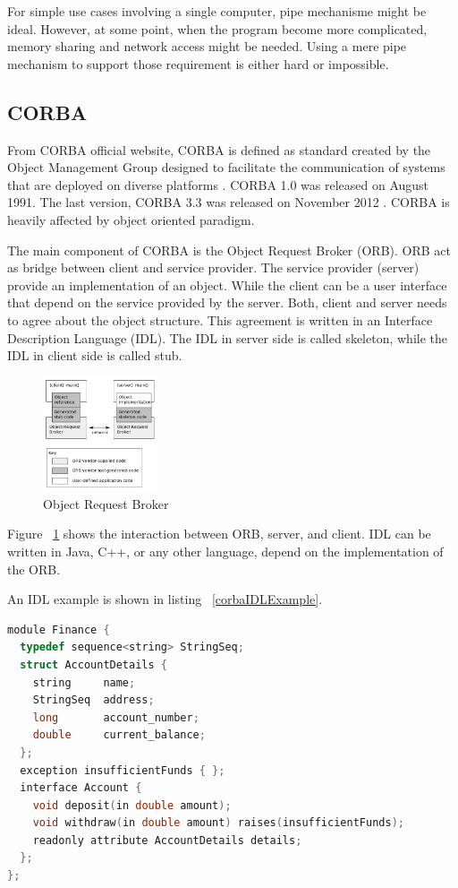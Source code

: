 \documentclass[conference]{IEEEtran}
\begin{document}
For simple use cases involving a single computer, pipe mechanisme might be ideal. 
However, at some point, when the program become more complicated, memory sharing 
and network access might be needed. Using a mere pipe mechanism to support those 
requirement is either hard or impossible.

\subsection{CORBA}

From CORBA official website, CORBA is defined as standard created by the Object 
Management Group designed to facilitate the communication of systems 
that are deployed on diverse platforms \cite{corba}. CORBA 1.0 was released on August 
1991. The last version, CORBA 3.3 was released on November 2012 \cite{corbaspec}.
CORBA is heavily affected by object oriented paradigm.

The main component of CORBA is the Object Request Broker (ORB). ORB act as bridge 
between client and service provider. The service provider (server) provide an 
implementation of an object. While the client can be a user interface that depend on
the service provided by the server. Both, client and server needs to agree about the
object structure. This agreement is written in an Interface Description Language (IDL).
The IDL in server side is called skeleton, while the IDL in client side is called stub.

\begin{figure}
	\centering
	\includegraphics[width=0.3\textwidth]
		{images/Orb.jpg}
	\caption{Object Request Broker}
	\label{fig:orb}
\end{figure}

Figure ~\ref{fig:orb} shows the interaction between ORB, server, and client.
IDL can be written in Java, C++, or any other language, depend on the implementation of
the ORB.

An IDL example is shown in listing ~\ref{corbaIDLExample}.

\begin{lstlisting}[caption=CORBA IDL Example in C++, label=corbaIDLExample, language=c, basicstyle=\small, breaklines=true]
module Finance {
  typedef sequence<string> StringSeq;
  struct AccountDetails {
    string     name;
    StringSeq  address;
    long       account_number;
    double     current_balance;
  };
  exception insufficientFunds { };
  interface Account {
    void deposit(in double amount);
    void withdraw(in double amount) raises(insufficientFunds);
    readonly attribute AccountDetails details;
  };
};
\end{lstlisting}
\end{document}
